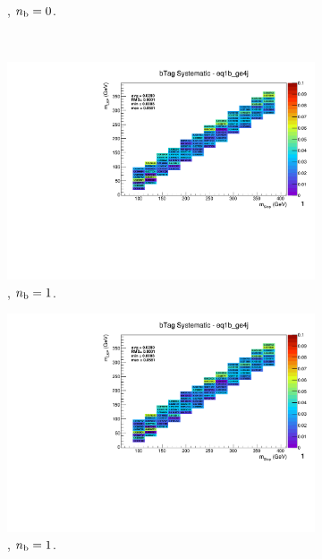 \begin{figure}[ht!]
\begin{subfigure}[b]{0.32\textwidth}
    \caption{\njhigh, $n_{\text{b}} = 0$.}
  \end{subfigure}\\
  \begin{subfigure}[b]{0.32\textwidth}
    \includegraphics[width=\textwidth, page=14]{Figs/sms/t2degen/v19_3/systs/T2_4body_bTag_eq1b_ge4j.pdf}
    \caption{\njhigh, $n_{\text{b}} = 1$.}
  \end{subfigure}
  \begin{subfigure}[b]{0.32\textwidth}
    \includegraphics[width=\textwidth, page=9]{Figs/sms/t2degen/v19_3/systs/T2_4body_bTag_eq1b_ge4j.pdf}
    \caption{\njhigh, $n_{\text{b}} = 1$.}
  \end{subfigure}
  \begin{subfigure}[b]{0.32\textwidth}

\end{subfigure}
\end{figure}
